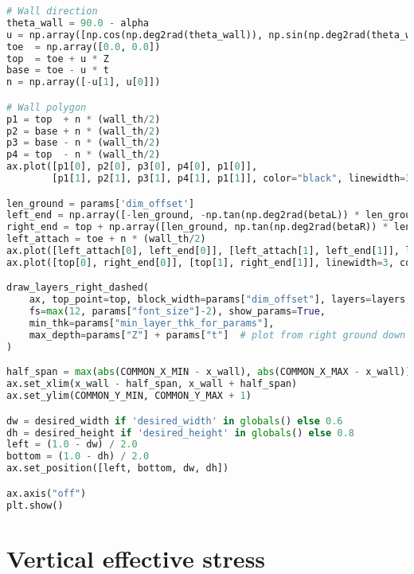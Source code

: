 \begin{lstlisting}[language=Python]
# Wall direction
theta_wall = 90.0 - alpha
u = np.array([np.cos(np.deg2rad(theta_wall)), np.sin(np.deg2rad(theta_wall))])
toe  = np.array([0.0, 0.0])
top  = toe + u * Z
base = toe - u * t
n = np.array([-u[1], u[0]])

# Wall polygon
p1 = top  + n * (wall_th/2)
p2 = base + n * (wall_th/2)
p3 = base - n * (wall_th/2)
p4 = top  - n * (wall_th/2)
ax.plot([p1[0], p2[0], p3[0], p4[0], p1[0]],
        [p1[1], p2[1], p3[1], p4[1], p1[1]], color="black", linewidth=3)

len_ground = params['dim_offset']
left_end = np.array([-len_ground, -np.tan(np.deg2rad(betaL)) * len_ground])
right_end = top + np.array([len_ground, np.tan(np.deg2rad(betaR)) * len_ground])
left_attach = toe + n * (wall_th/2)
ax.plot([left_attach[0], left_end[0]], [left_attach[1], left_end[1]], linewidth=3, color="black")
ax.plot([top[0], right_end[0]], [top[1], right_end[1]], linewidth=3, color="black")

draw_layers_right_dashed(
    ax, top_point=top, block_width=params["dim_offset"], layers=layers,
    fs=max(12, params["font_size"]-2), show_params=True,
    min_thk=params["min_layer_thk_for_params"],
    max_depth=params["Z"] + params["t"]  # plot from right ground down to Z+T
)

half_span = max(abs(COMMON_X_MIN - x_wall), abs(COMMON_X_MAX - x_wall))
ax.set_xlim(x_wall - half_span, x_wall + half_span)
ax.set_ylim(COMMON_Y_MIN, COMMON_Y_MAX + 1)

dw = desired_width if 'desired_width' in globals() else 0.6
dh = desired_height if 'desired_height' in globals() else 0.8
left = (1.0 - dw) / 2.0
bottom = (1.0 - dh) / 2.0
ax.set_position([left, bottom, dw, dh])

ax.axis("off")
plt.show()
\end{lstlisting}

\section{Vertical effective stress}

